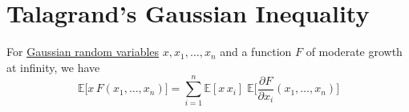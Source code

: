 \section{Talagrand's Gaussian Inequality}

  \begin{lemma}
    \label{thm:gaussian-integration-by-parts-formula}
  For \hyperref[prob-def:gaussian-random-variable]{Gaussian random variables} $x, x_1, \ldots, x_n$ and a function $F$ of moderate growth at infinity, we have 
  \begin{equation}
    \mathbb{E}\big[ x \, F(x_1, \ldots, x_n) \big] = \sum_{i=1}^n \mathbb{E}[x \, x_i] \; \mathbb{E}\bigg[ \frac{\partial F}{\partial x_i} (x_1, \ldots, x_n) \bigg]
  \end{equation}
  \end{lemma}

